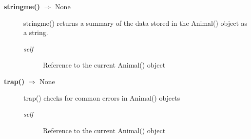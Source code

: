 \begin{description}
\item[\textbf{stringme()} $\Rightarrow$ None]
stringme() returns a summary of the data stored in the Animal() object as a string.
\begin{description}
\item[\emph{self}] Reference to the current Animal() object
\end{description}


\item[\textbf{trap()} $\Rightarrow$ None]
trap() checks for common errors in Animal() objects
\begin{description}
\item[\emph{self}] Reference to the current Animal() object
\end{description}

\end{description}

